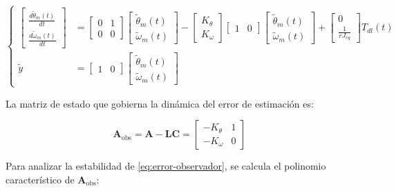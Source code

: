 \documentclass[blue,fullpaper]{ludusofficial}  %
\begin{document}
\begin{equation}
\label{eq:error-observador}
\left\{
\begin{aligned}
\begin{bmatrix} \frac{d \tilde{\theta}_{m}(t) }{dt} \\ \frac{d \tilde{\omega}_{m}(t) }{dt}  \end{bmatrix} 
 & = \begin{bmatrix} 0 & 1 \\0 & 0 \end{bmatrix} \begin{bmatrix} \tilde{\theta}_{m}(t) \\ \tilde{\omega}_{m}(t) \end{bmatrix} - \begin{bmatrix} K_{\theta} \\ K_{\omega} \end{bmatrix} \begin{bmatrix} 1 & 0 \end{bmatrix} \begin{bmatrix} \tilde{\theta}_{m}(t) \\ \tilde{\omega}_{m}(t) \end{bmatrix} + \begin{bmatrix} 0 \\ \frac{1}{rJ_{eq}} \end{bmatrix} T_{dl}(t) \\
\tilde{y} & = \begin{bmatrix} 1 & 0 \end{bmatrix} \begin{bmatrix} \tilde{\theta}_{m}(t) \\ \tilde{\omega}_{m}(t) \end{bmatrix}
\end{aligned}
\right.
\end{equation}

La matriz de estado que gobierna la dinámica del error de estimación es:

\begin{equation}
\label{eq:matriz-error-observador}
\mathbf{A}_{\text{obs}} = \mathbf{A}-\mathbf{L}\mathbf{C} = \begin{bmatrix}
-K_{\theta} & 1 \\
-K_{\omega} & 0
\end{bmatrix}
\end{equation}

Para analizar la estabilidad de \eqref{eq:error-observador}, se calcula el polinomio característico de $\mathbf{A}_{\text{obs}}$:
\end{document}
